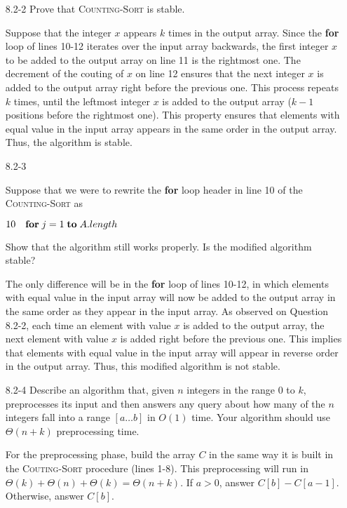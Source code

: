 \begin{enumerate}
\item[8.2-2]{Prove that \textsc{Counting-Sort} is stable.}

\begin{framed}
Suppose that the integer $x$ appears $k$ times in the output array. Since the
\textbf{for} loop of lines 10-12 iterates over the input array backwards, the
first integer $x$ to be added to the output array on line 11 is the rightmost
one. The decrement of the couting of $x$ on line 12 ensures that the next
integer $x$ is added to the output array right before the previous one. This
process repeats $k$ times, until the leftmost integer $x$ is added to the
output array ($k - 1$ positions before the rightmost one). This property ensures
that elements with equal value in the input array appears in the same order in
the output array. Thus, the algorithm is stable.
\end{framed}

\item[8.2-3]{Suppose that we were to rewrite the \textbf{for} loop header in
line 10 of the \textsc{Counting-Sort} as

$10\quad\text{\textbf{for}}\;j = 1\;\text{\textbf{to}}\;A.length$

Show that the algorithm still works properly. Is the modified algorithm stable?
}

\begin{framed}
The only difference will be in the \textbf{for} loop of lines 10-12, in which
elements with equal value in the input array will now be added to the output
array in the same order as they appear in the input array. As observed on
Question 8.2-2, each time an element with value $x$ is added to the output
array, the next element with value $x$ is added right before the previous one.
This implies that elements with equal value in the input array will appear in
reverse order in the output array. Thus, this modified algorithm is not stable.
\end{framed}

\item[8.2-4]{Describe an algorithm that, given $n$ integers in the range $0$ to
$k$, preprocesses its input and then answers any query about how many of the $n$
integers fall into a range $[a \dots b]$ in $O(1)$ time. Your algorithm should
use $\Theta(n + k)$ preprocessing time.}

\begin{framed}
For the preprocessing phase, build the array $C$ in the same way it is built in
the \textsc{Couting-Sort} procedure (lines 1-8). This preprocessing will run in
$\Theta(k) + \Theta(n) + \Theta(k) = \Theta(n + k)$. If $a > 0$, answer
$C[b] - C[a - 1]$. Otherwise, answer $C[b]$.
\end{framed}

\end{enumerate}

